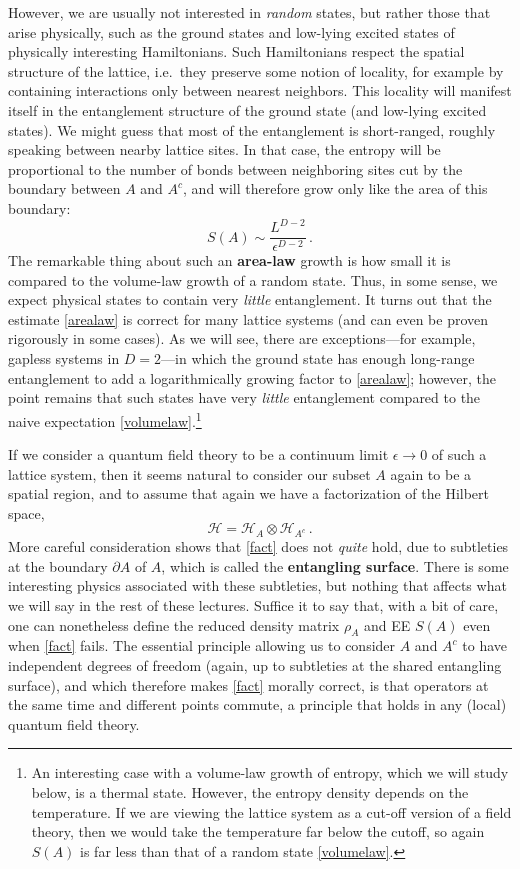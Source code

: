 \documentclass[11pt]{article}
\newcommand{\HH}{\mathcal{H}}
\begin{document}
However, we are usually not interested in \emph{random} states, but rather those that arise physically, such as the ground states and low-lying excited states of physically interesting Hamiltonians. Such Hamiltonians respect the spatial structure of the lattice, i.e.\ they preserve some notion of locality, for example by containing interactions only between nearest neighbors. This locality will manifest itself in the entanglement structure of the ground state (and low-lying excited states). We might guess that most of the entanglement is short-ranged, roughly speaking between nearby lattice sites. In that case, the entropy will be proportional to the number of bonds between neighboring sites cut by the boundary between $A$ and $A^c$, and will therefore grow only like the area of this boundary:
\begin{equation}\label{arealaw}
S(A) \sim \frac{L^{D-2}}{\epsilon^{D-2}}\,.
\end{equation}
The remarkable thing about such an \textbf{area-law} growth is how small it is compared to the volume-law growth of a random state. Thus, in some sense, we expect physical states to contain very \emph{little} entanglement. It turns out that the estimate \eqref{arealaw} is correct for many lattice systems (and can even be proven rigorously in some cases). As we will see, there are exceptions---for example, gapless systems in $D=2$---in which the ground state has enough long-range entanglement to add a logarithmically growing factor to \eqref{arealaw}; however, the point remains that such states have very \emph{little} entanglement compared to the naive expectation \eqref{volumelaw}.\footnote{An interesting case with a volume-law growth of entropy, which we will study below, is a thermal state. However, the entropy density depends on the temperature. If we are viewing the lattice system as a cut-off version of a field theory, then we would take the temperature far below the cutoff, so again $S(A)$ is far less than that of a random state \eqref{volumelaw}.}

If we consider a quantum field theory to be a continuum limit $\epsilon\to0$ of such a lattice system, then it seems natural to consider our subset $A$ again to be a spatial region, and to assume that again we have a factorization of the Hilbert space,
\begin{equation}\label{fact}
\HH = \HH_A\otimes\HH_{A^c}\,.
\end{equation}
More careful consideration shows that \eqref{fact} does not \emph{quite} hold, due to subtleties at the boundary $\partial A$ of $A$, which is called the \textbf{entangling surface}. There is some interesting physics associated with these subtleties, but nothing that affects what we will say in the rest of these lectures. Suffice it to say that, with a bit of care, one can nonetheless define the reduced density matrix $\rho_A$ and EE $S(A)$ even when \eqref{fact} fails. The essential principle allowing us to consider $A$ and $A^c$ to have independent degrees of freedom (again, up to subtleties at the shared entangling surface), and which therefore makes \eqref{fact} morally correct, is that operators at the same time and different points commute, a principle that holds in any (local) quantum field theory.
\end{document}
